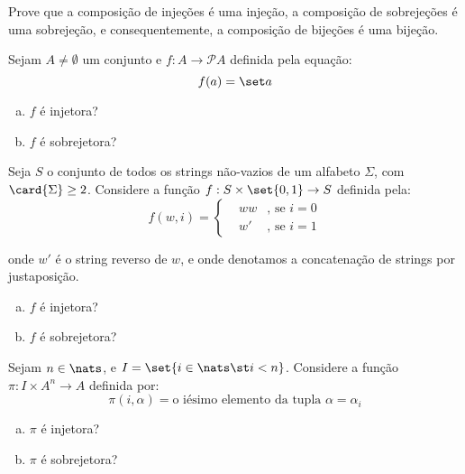 \begin{exercise}
    Prove que a composição de injeções é uma injeção, a composição de sobrejeções é uma sobrejeção, e consequentemente, a composição de bijeções é uma bijeção.
\end{exercise}

\begin{exercise}
    Sejam $A \not = \emptyset$ um conjunto e $f : A \to \mathcal P A$ definida pela equação:
    $$
        f(a) = \set a
    $$
    \begin {enumerate} [(a)]
        \item $f$ é injetora?
        \item $f$ é sobrejetora?
    \end {enumerate}
\end{exercise}

\begin{exercise}
    Seja $S$ o conjunto de todos os strings não-vazios de um alfabeto $\Sigma$, com $\card{\Sigma} \geq 2$. Considere a função $f : S \times \set{0,1} \to S$ definida pela:
    $$
        f(w, i) = \left \{ \begin{aligned}
                                &ww &\text{, se } i = 0\\
                                &w' &\text{, se } i = 1
                           \end{aligned}
                  \right.
    $$  

    onde $w'$ é o string reverso de $w$, e onde denotamos a concatenação de strings por justaposição.

    \begin{enumerate}[(a)]
        \item $f$ é injetora?
        \item $f$ é sobrejetora?
    \end{enumerate}
\end{exercise}

\begin{exercise}
    Sejam $n \in \nats$, e $I = \set{i \in \nats \st i < n}$. Considere a função $\pi : I \times A^n \to A$ definida por:
    $$
        \pi (i, \alpha) = \text{o iésimo elemento da tupla } \alpha = \alpha_i
    $$

    \begin{enumerate}[(a)]
        \item $\pi$ é injetora?
        \item $\pi$ é sobrejetora?
    \end{enumerate}
\end{exercise}
